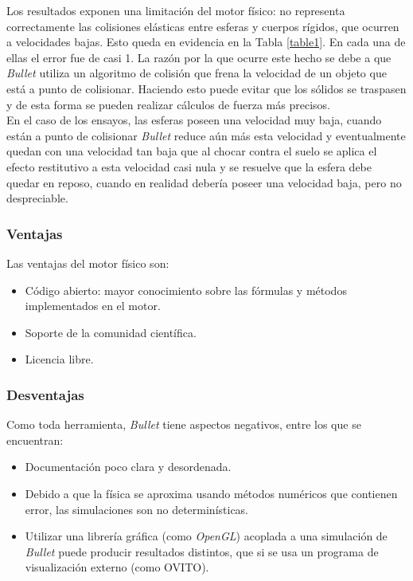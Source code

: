 \documentclass{article}
\begin{document}
\noindent Los resultados exponen una limitaci\'on del motor f\'isico: no representa correctamente las colisiones el\'asticas entre esferas y cuerpos r\'igidos, que ocurren a velocidades bajas. Esto queda en evidencia en la Tabla \ref{table1}. En cada una de ellas el error fue de casi 1. La raz\'on por la que ocurre este hecho se debe a que \textit{Bullet} utiliza un algoritmo de colisi\'on que frena la velocidad de un objeto que est\'a a punto de colisionar. Haciendo esto puede evitar que los s\'olidos se traspasen y de esta forma se pueden realizar c\'alculos de fuerza m\'as precisos. \\
En el caso de los ensayos, las esferas poseen una velocidad muy baja, cuando est\'an a punto de colisionar \textit{Bullet} reduce a\'un m\'as esta velocidad y eventualmente quedan con una velocidad tan baja que al chocar contra el suelo se aplica el efecto restitutivo a esta velocidad casi nula y se resuelve que la esfera debe quedar en reposo, cuando en realidad deber\'ia poseer una velocidad baja, pero no despreciable.


\subsubsection{Ventajas}
Las ventajas del motor f\'isico son:
\begin{itemize}[leftmargin=5.5mm]
\item C\'odigo abierto: mayor conocimiento sobre las f\'ormulas y m\'etodos implementados en el motor.
\item Soporte de la comunidad cient\'ifica.
\item Licencia libre.
\end{itemize}


\subsubsection{Desventajas}
Como toda herramienta, \textit{Bullet} tiene aspectos negativos, entre los que se encuentran: 
\begin{itemize}[leftmargin=5.5mm]
\item Documentaci\'on poco clara y desordenada.
\item Debido a que la f\'isica se aproxima usando m\'etodos num\'ericos que contienen error, las simulaciones son no determin\'isticas.
\item Utilizar una librer\'ia gr\'afica (como \textit{OpenGL}) acoplada a una simulaci\'on  de \textit{Bullet} puede producir resultados distintos, que si se usa un programa de visualizaci\'on externo (como OVITO).
\end{itemize}
\end{document}
